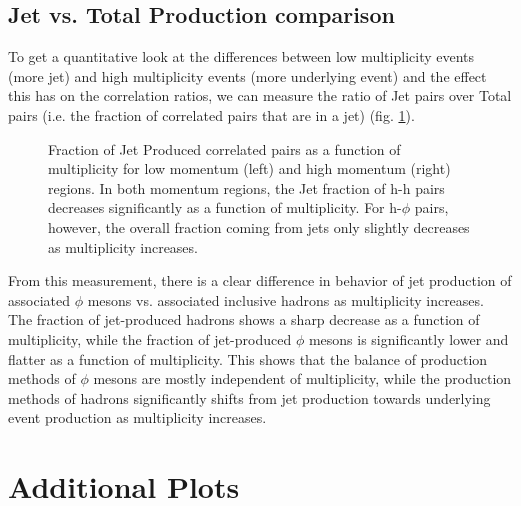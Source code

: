 \documentclass[ALICE,manyauthors]{ALICE_analysis_notes}
\begin{document}
\subsection{Jet vs. Total Production comparison}

To get a quantitative look at the differences between low multiplicity events (more jet) and high multiplicity events (more underlying event) and the effect this has on the correlation ratios, we can measure the ratio of Jet pairs over Total pairs (i.e. the fraction of correlated pairs that are in a jet) (fig. \ref{jetvstot}).

\begin{figure}[ht]
\centering
\begin{subfigure}{
\texttt{[image: images/addendum/jet2totratio\_lowpt.pdf]}}
\end{subfigure}
\begin{subfigure}{
\texttt{[image: images/addendum/jet2totratio\_highpt.pdf]}}
\end{subfigure}
\caption{Fraction of Jet Produced correlated pairs as a function of multiplicity for low momentum (left) and high momentum (right) regions.  In both momentum regions, the Jet fraction of h-h pairs decreases significantly as a function of multiplicity.  For h-$\phi$ pairs, however, the overall fraction coming from jets only slightly decreases as multiplicity increases.}
\label{jetvstot}
\end{figure}

From this measurement, there is a clear difference in behavior of jet production of associated $\phi$ mesons vs. associated inclusive hadrons as multiplicity increases.  The fraction of jet-produced hadrons shows a sharp decrease as a function of multiplicity, while the fraction of jet-produced $\phi$ mesons is significantly lower and flatter as a function of multiplicity. This shows that the balance of production methods of $\phi$ mesons are mostly independent of multiplicity, while the production methods of hadrons significantly shifts from jet production towards underlying event production as multiplicity increases.

\clearpage
\section {Additional Plots}
\end{document}
